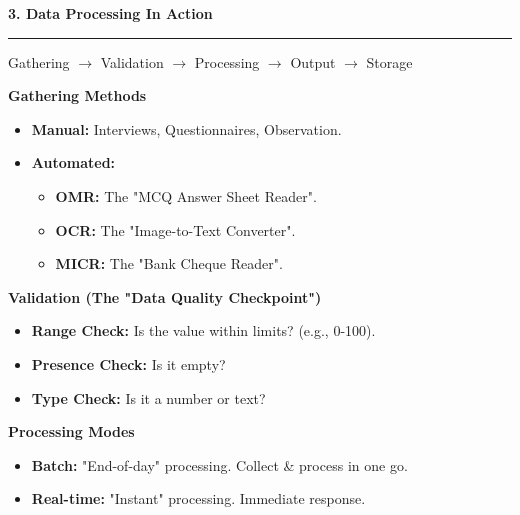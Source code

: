 \documentclass[a4paper, 8pt]{extarticle}
\newcommand{\sectionheading}[1]{\large\textbf{#1}\par\noindent\rule{\linewidth}{0.4pt}}
\newcommand{\subsectionheading}[1]{\normalsize\textbf{#1}}
\begin{document}
\begin{multicols}{2}
\sectionheading{3. Data Processing In Action}
\vspace{0.5em}
\begin{tcolorbox}[title=\textbf{The Cycle}]
    Gathering $\rightarrow$ Validation $\rightarrow$ Processing $\rightarrow$ Output $\rightarrow$ Storage
\end{tcolorbox}
\subsectionheading{Gathering Methods}
\begin{itemize}
    \item \textbf{Manual:} Interviews, Questionnaires, Observation.
    \item \textbf{Automated:}
    \begin{itemize}
        \item \textbf{OMR:} The "MCQ Answer Sheet Reader".
        \item \textbf{OCR:} The "Image-to-Text Converter".
        \item \textbf{MICR:} The "Bank Cheque Reader".
    \end{itemize}
\end{itemize}
\subsectionheading{Validation (The "Data Quality Checkpoint")}
\begin{itemize}
    \item \textbf{Range Check:} Is the value within limits? (e.g., 0-100).
    \item \textbf{Presence Check:} Is it empty?
    \item \textbf{Type Check:} Is it a number or text?
\end{itemize}
\subsectionheading{Processing Modes}
\begin{itemize}
    \item \textbf{Batch:} "End-of-day" processing. Collect \& process in one go.
    \item \textbf{Real-time:} "Instant" processing. Immediate response.
\end{itemize}


\end{multicols}
\end{document}
